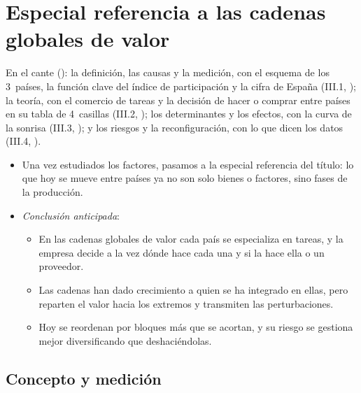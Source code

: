 \documentclass[11pt]{article}
\begin{document}
\section{Especial referencia a las cadenas globales de valor}\label{sec:cgv}

\begin{notaopositor}
En el cante (): la definición, las causas y la medición, con el esquema de los 3~países, la función clave del índice de participación y la cifra de España (III.1, ); la teoría, con el comercio de tareas y la decisión de hacer o comprar entre países en su tabla de 4~casillas (III.2, ); los determinantes y los efectos, con la curva de la sonrisa (III.3, ); y los riesgos y la reconfiguración, con lo que dicen los datos (III.4, ).
\end{notaopositor}

\begin{itemize}
\item Una vez estudiados los factores, pasamos a la especial referencia del título: lo que hoy se mueve entre países ya no son solo bienes o factores, sino fases de la producción.
\item \emph{Conclusión anticipada}:
  \begin{itemize}
  \item En las cadenas globales de valor cada país se especializa en tareas, y la empresa decide a la vez dónde hace cada una y si la hace ella o un proveedor.
  \item Las cadenas han dado crecimiento a quien se ha integrado en ellas, pero reparten el valor hacia los extremos y transmiten las perturbaciones.
  \item Hoy se reordenan por bloques más que se acortan, y su riesgo se gestiona mejor diversificando que deshaciéndolas.
  \end{itemize}
\end{itemize}

\subsection{Concepto y medición}\label{sec:cgv-medicion}
\end{document}
